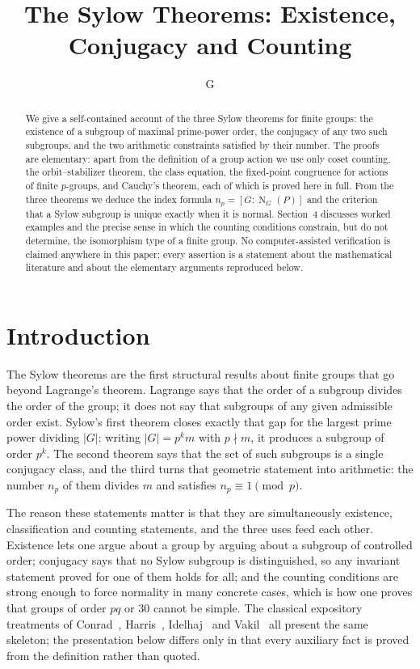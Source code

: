 \documentclass[11pt]{article}
\title{The Sylow Theorems: Existence, Conjugacy and Counting}
\author{G}
\date{}
\theoremstyle{definition}
\theoremstyle{remark}
\newcommand{\Norm}{\operatorname{N}}
\begin{document}
\maketitle

\begin{abstract}
We give a self-contained account of the three Sylow theorems for finite groups: the existence of a subgroup of maximal prime-power order, the conjugacy of any two such subgroups, and the two arithmetic constraints satisfied by their number. The proofs are elementary: apart from the definition of a group action we use only coset counting, the orbit--stabilizer theorem, the class equation, the fixed-point congruence for actions of finite $p$-groups, and Cauchy's theorem, each of which is proved here in full. From the three theorems we deduce the index formula $n_p=[G:\Norm_G(P)]$ and the criterion that a Sylow subgroup is unique exactly when it is normal. Section~4 discusses worked examples and the precise sense in which the counting conditions constrain, but do not determine, the isomorphism type of a finite group. No computer-assisted verification is claimed anywhere in this paper; every assertion is a statement about the mathematical literature and about the elementary arguments reproduced below.
\end{abstract}

\section{Introduction}

The Sylow theorems are the first structural results about finite groups that go beyond Lagrange's theorem. Lagrange says that the order of a subgroup divides the order of the group; it does not say that subgroups of any given admissible order exist. Sylow's first theorem closes exactly that gap for the largest prime power dividing $|G|$: writing $|G|=p^{k}m$ with $p\nmid m$, it produces a subgroup of order $p^{k}$. The second theorem says that the set of such subgroups is a single conjugacy class, and the third turns that geometric statement into arithmetic: the number $n_p$ of them divides $m$ and satisfies $n_p\equiv 1 \pmod p$.

The reason these statements matter is that they are simultaneously existence, classification and counting statements, and the three uses feed each other. Existence lets one argue about a group by arguing about a subgroup of controlled order; conjugacy says that no Sylow subgroup is distinguished, so any invariant statement proved for one of them holds for all; and the counting conditions are strong enough to force normality in many concrete cases, which is how one proves that groups of order $pq$ or $30$ cannot be simple. The classical expository treatments of Conrad~\cite{conrad}, Harris~\cite{harris}, Idelhaj~\cite{idelhaj} and Vakil~\cite{vakil} all present the same skeleton; the presentation below differs only in that every auxiliary fact is proved from the definition rather than quoted.
\end{document}

